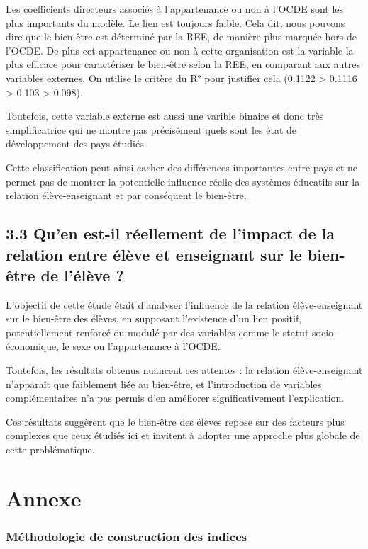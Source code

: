 \documentclass[
  french,
  11pt,
  a4paper,
  oneside]{report}
\begin{document}
Les coefficients directeurs associés à l'appartenance ou non à l'OCDE
sont les plus importants du modèle. Le lien est toujours faible. Cela
dit, nous pouvons dire que le bien-être est déterminé par la REE, de
manière plus marquée hors de l'OCDE. De plus cet appartenance ou non à
cette organisation est la variable la plus efficace pour caractériser le
bien-être selon la REE, en comparant aux autres variables externes. On
utilise le critère du R² pour justifier cela (0.1122 \textgreater{}
0.1116 \textgreater{} 0.103 \textgreater{} 0.098).

Toutefois, cette variable externe est aussi une varible binaire et donc
très simplificatrice qui ne montre pas précisément quels sont les état
de développement des pays étudiés.

Cette classification peut ainsi cacher des différences importantes entre
pays et ne permet pas de montrer la potentielle influence réelle des
systèmes éducatifs sur la relation élève-enseignant et par conséquent le
bien-être.

\section{3.3 Qu'en est-il réellement de l'impact de la relation entre
élève et enseignant sur le bien-être de l'élève
?}\label{quen-est-il-ruxe9ellement-de-limpact-de-la-relation-entre-uxe9luxe8ve-et-enseignant-sur-le-bien-uxeatre-de-luxe9luxe8ve}

L'objectif de cette étude était d'analyser l'influence de la relation
élève-enseignant sur le bien-être des élèves, en supposant l'existence
d'un lien positif, potentiellement renforcé ou modulé par des variables
comme le statut socio-économique, le sexe ou l'appartenance à l'OCDE.

Toutefois, les résultats obtenus nuancent ces attentes : la relation
élève-enseignant n'apparaît que faiblement liée au bien-être, et
l'introduction de variables complémentaires n'a pas permis d'en
améliorer significativement l'explication.

Ces résultats suggèrent que le bien-être des élèves repose sur des
facteurs plus complexes que ceux étudiés ici et invitent à adopter une
approche plus globale de cette problématique.

\chapter{Annexe}\label{annexe}

\subsection{Méthodologie de construction des
indices}\label{muxe9thodologie-de-construction-des-indices}
\end{document}
